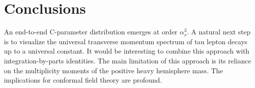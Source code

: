\section{Conclusions}\label{sec:conclusions}

An end-to-end C-parameter distribution emerges at order $\alpha_s^3$. A
natural next step is to visualize the universal transverse momentum
spectrum of tau lepton decays up to a universal constant. It would be
interesting to combine this approach with integration-by-parts
identities. The main limitation of this approach is its reliance on the
multiplicity moments of the positive heavy hemisphere mass. The
implications for conformal field theory are profound.

